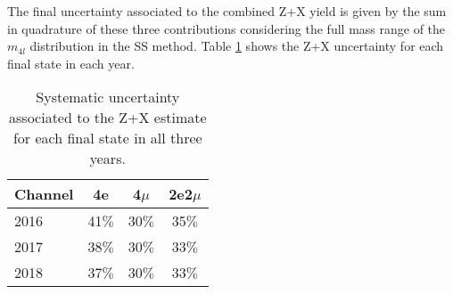     

The final uncertainty associated to the combined Z+X yield is given by the sum in quadrature of these three contributions considering the full mass range of the $m_{4l}$ distribution in the SS method.
Table \ref{tab:zxUnc} shows the Z+X uncertainty for each final state in each year.

\begin{table}[!htb]
\begin{center}
    \begin{tabular}{ | l | c | c | c |  }        \hline
   Channel  & 4e       & 4$\mu$    & 2e2$\mu$ \\ \hline \hline
   2016     & 41$\%$   & 30$\%$    & 35$\%$   \\
   2017     & 38$\%$   & 30$\%$    & 33$\%$   \\
   2018     & 37$\%$   & 30$\%$    & 33$\%$   \\ \hline
    \end{tabular}
    \caption{ Systematic uncertainty associated to the Z+X estimate for each final state in all three years. }
    \label{tab:zxUnc}
\end{center}
\end{table}

